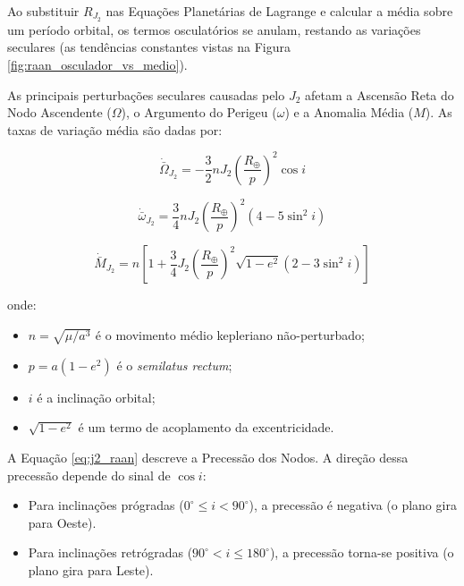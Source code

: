 Ao substituir $R_{J_2}$ nas Equações Planetárias de Lagrange e calcular a média sobre um período orbital, os termos osculatórios se anulam, restando as variações seculares (as tendências constantes vistas na Figura \ref{fig:raan_osculador_vs_medio}).

As principais perturbações seculares causadas pelo $J_2$ afetam a Ascensão Reta do Nodo Ascendente ($\Omega$), o Argumento do Perigeu ($\omega$) e a Anomalia Média ($M$). As taxas de variação média são dadas por:

\begin{equation}
    \dot{\bar{\Omega}}_{J_2} = - \frac{3}{2} n J_2 \left( \frac{R_\oplus}{p} \right)^2 \cos i
    \label{eq:j2_raan}
\end{equation}

\begin{equation}
    \dot{\bar{\omega}}_{J_2} = \frac{3}{4} n J_2 \left( \frac{R_\oplus}{p} \right)^2 \left( 4 - 5 \sin^2 i \right)
    \label{eq:j2_argp}
\end{equation}

\begin{equation}
    \dot{\bar{M}}_{J_2} = n \left[ 1 + \frac{3}{4} J_2 \left( \frac{R_\oplus}{p} \right)^2 \sqrt{1-e^2} \left( 2 - 3 \sin^2 i \right) \right]
    \label{eq:j2_mean_anomaly}
\end{equation}

\noindent onde:
\begin{itemize}
    \item $n = \sqrt{\mu/a^3}$ é o movimento médio kepleriano não-perturbado;
    \item $p = a(1 - e^2)$ é o \textit{semilatus rectum};
    \item $i$ é a inclinação orbital;
    \item $\sqrt{1-e^2}$ é um termo de acoplamento da excentricidade.
\end{itemize}

A Equação \ref{eq:j2_raan} descreve a Precessão dos Nodos. A direção dessa precessão depende do sinal de $\cos i$:

\begin{itemize}
    \item Para inclinações prógradas ($0^\circ \leq i < 90^\circ$), a precessão é negativa (o plano gira para Oeste).
    \item Para inclinações retrógradas ($90^\circ < i \leq 180^\circ$), a precessão torna-se positiva (o plano gira para Leste).
\end{itemize}

